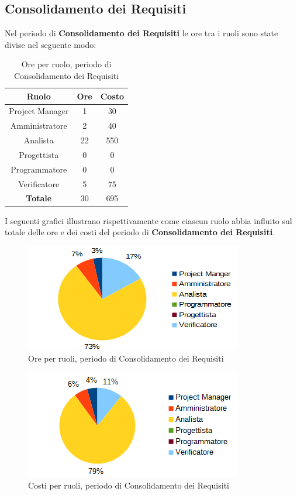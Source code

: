 	\subsection{Consolidamento dei Requisiti}
	Nel periodo di \textbf{Consolidamento dei Requisiti} le ore tra i ruoli sono state divise nel seguente modo: \\
	\begin{table}[H]
		\centering
		\begin{tabular}{|c|c|c|}
			\hline
			\textbf{Ruolo}		& \textbf{Ore}	& \textbf{Costo} \\
			\hline
			Project Manager		& 1				& 30	\\
			Amministratore		& 2				& 40	\\
			Analista			& 22			& 550	\\
			Progettista			& 0				& 0	\\
			Programmatore		& 0				& 0	\\
			Verificatore		& 5				& 75	\\
			\hline
			\textbf{Totale}		& 30			& 695	\\
			\hline
		\end{tabular}
		\caption{Ore per ruolo, periodo di Consolidamento dei Requisiti}
		\end{table}
	I seguenti grafici illustrano rispettivamente come ciascun ruolo abbia influito sul totale
delle ore e dei costi del periodo di \textbf{Consolidamento dei Requisiti}. \\
	\begin{figure}[H]
		\centering
		\includegraphics[width=1\linewidth]{immagini/grafici/analisi_dettaglio-torta.png}
		\caption{Ore per ruoli, periodo di Consolidamento dei Requisiti}
	\end{figure}
	\begin{figure}[H]
		\centering
		\includegraphics[width=1\linewidth]{immagini/grafici/analisi_dettaglio-torta-costo.png}
		\caption{Costi per ruoli, periodo di Consolidamento dei Requisiti}
	\end{figure}
